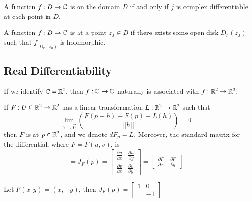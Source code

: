 \begin{definition}
    A function $f:D\rightarrow \mathbb C$ is  on the domain $D$ if and only if $f$ is complex differentiable at each point in $D$.
\end{definition}


\begin{definition}
    A function $f:D\rightarrow \mathbb C$ is  at a point $z_0 \in D$ if there exists some open disk $D_r(z_0)$ such that $f\vert_{D_r(z_0)}$ is holomorphic.
\end{definition}

\subsection{Real Differentiability}

If we identify $\mathbb C=\mathbb R^2$, then $f:\mathbb C\rightarrow \mathbb C$ naturally is associated with $f:\mathbb R^2\rightarrow \mathbb R^2$.

\begin{definition}
    If $F:U\subseteq \mathbb R^2\rightarrow\mathbb R^2$ has a linear transformation $L:\mathbb R^2\rightarrow \mathbb R^2$ such that \begin{equation*}
        \lim\limits_{h\rightarrow \vec{0}}\left(\frac{F(p+h)-F(p)-L(h)}{||h||}\right) = 0
    \end{equation*}
    then $F$ is  at $p \in \mathbb R^2$, and we denote $dF_p = L$. Moreover, the standard matrix for the differential, where $F= F(u,v)$, is \begin{equation*}
        [dF_p] = J_F(p) = \begin{bmatrix} \frac{\partial u}{\partial x} & \frac{\partial u}{\partial y} \\ \frac{\partial v}{\partial x} & \frac{\partial v}{\partial y}\end{bmatrix} = \left[\begin{array}{c|c} \frac{\partial F}{\partial x} & \frac{\partial F}{\partial y}\end{array}\right]
    \end{equation*}
\end{definition}

\begin{example}
    Let $F(x,y) = (x,-y)$, then  $J_F(p) = \begin{bmatrix} 1 & 0 \\ & -1\end{bmatrix}$
\end{example}

